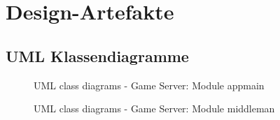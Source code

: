 \documentclass[11pt,ngerman]{article}
\begin{document}
    \section{Design-Artefakte}

        \subsection{UML Klassendiagramme}

            \label{fig:GameServerModulDiagramm}

            \begin{figure}[H]
                \centering
                \caption{UML class diagrams - Game Server: Module appmain}
                \label{fig:UMLclassdiagram_Moduleappmain}
            \end{figure}
            \begin{figure}[H]
                \centering
                \caption{UML class diagrams - Game Server: Module middleman}
                \label{fig:UMLclassdiagram_Modulemiddleman}
            \end{figure}
            \newpage
\end{document}
